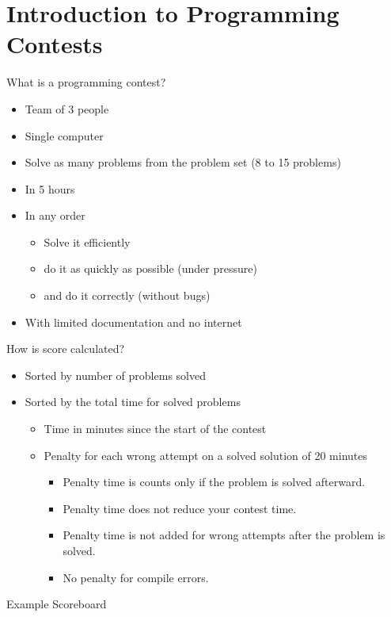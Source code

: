\documentclass[11pt,pdf, aspectratio=169]{beamer}
\begin{document}
  \section{Introduction to Programming Contests}
  \begin{frame}{What is a programming contest?}
    \begin{itemize}
      \item<1-> Team of 3 people
      \item<1-> Single computer
      \item<1-> Solve as many problems from the problem set (8 to 15 problems)
      \item<1-> In 5 hours
      \item<1-> In any order
      \begin{itemize}
        \item<2-> Solve it efficiently
        \item<2-> do it as quickly as possible (under pressure)
        \item<2-> and do it correctly (without bugs)
      \end{itemize}
      \item<3-> With limited documentation and no internet
    \end{itemize}
  \end{frame}
  \begin{frame}{How is score calculated?}
    \begin{itemize}
      \item<1-> Sorted by number of problems solved
      \item<2-> Sorted by the total time for solved problems
      \begin{itemize}
        \item<3->  Time in minutes since the start of the contest
        \item<3-> Penalty for each wrong attempt on a solved solution of 20 minutes
        \begin{itemize}
          \item<4-> Penalty time is counts only if the problem is solved afterward.
          \item<4-> Penalty time does not reduce your contest time.
          \item<4-> Penalty time is not added for wrong attempts after the problem is solved.
          \item<4-> No penalty for compile errors.
        \end{itemize}
      \end{itemize}
    \end{itemize}
  \end{frame}
  {
    \begin{frame}{Example Scoreboard}
    \end{frame}
  }
\end{document}
